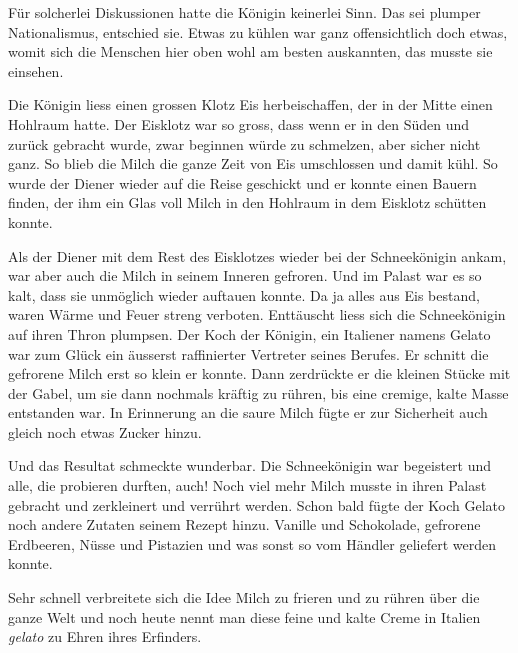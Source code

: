 Für solcherlei Diskussionen hatte die Königin keinerlei Sinn. Das sei plumper Nationalismus, entschied sie. Etwas zu kühlen war ganz offensichtlich doch etwas, womit sich die Menschen hier oben wohl am besten auskannten, das musste sie einsehen. 

Die Königin liess einen grossen Klotz Eis herbeischaffen, der in der Mitte einen Hohlraum hatte. Der Eisklotz war so gross, dass wenn er in den Süden und zurück gebracht wurde, zwar beginnen würde zu schmelzen, aber sicher nicht ganz. So blieb die Milch die ganze Zeit von Eis umschlossen und damit kühl. So wurde der Diener wieder auf die Reise geschickt und er konnte einen Bauern finden, der ihm ein Glas voll Milch in den Hohlraum in dem Eisklotz schütten konnte.

Als der Diener mit dem Rest des Eisklotzes wieder bei der Schneekönigin ankam, war aber auch die Milch in seinem Inneren gefroren. Und im Palast war es so kalt, dass sie unmöglich wieder auftauen konnte. Da ja alles aus Eis bestand, waren Wärme und Feuer streng verboten. Enttäuscht liess sich die Schneekönigin auf ihren Thron plumpsen. Der Koch der Königin, ein Italiener namens Gelato war zum Glück ein äusserst raffinierter Vertreter seines Berufes. Er schnitt die gefrorene Milch erst so klein er konnte. Dann zerdrückte er die kleinen Stücke mit der Gabel, um sie dann nochmals kräftig zu rühren, bis eine cremige, kalte Masse entstanden war. In Erinnerung an die saure Milch fügte er zur Sicherheit auch gleich noch etwas Zucker hinzu.

Und das Resultat schmeckte wunderbar. Die Schneekönigin war begeistert und alle, die probieren durften, auch! Noch viel mehr Milch musste in ihren Palast gebracht und zerkleinert und verrührt werden. Schon bald fügte der Koch Gelato noch andere Zutaten seinem Rezept hinzu. Vanille und Schokolade, gefrorene Erdbeeren, Nüsse und Pistazien und was sonst so vom Händler geliefert werden konnte.

Sehr schnell verbreitete sich die Idee Milch zu frieren und zu rühren über die ganze Welt und noch heute nennt man diese feine und kalte Creme in Italien {\itshape gelato} zu Ehren ihres Erfinders.  \hfill {\color{DeepPink}\decofourleft}
